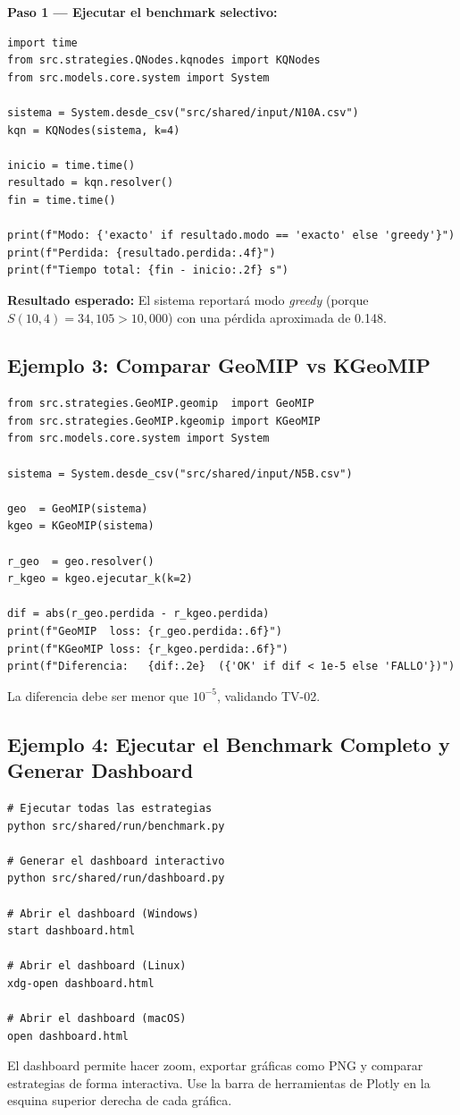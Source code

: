\textbf{Paso 1 — Ejecutar el benchmark selectivo:}

\begin{lstlisting}[style=python, caption={Benchmark selectivo para N10A.}]
import time
from src.strategies.QNodes.kqnodes import KQNodes
from src.models.core.system import System

sistema = System.desde_csv("src/shared/input/N10A.csv")
kqn = KQNodes(sistema, k=4)

inicio = time.time()
resultado = kqn.resolver()
fin = time.time()

print(f"Modo: {'exacto' if resultado.modo == 'exacto' else 'greedy'}")
print(f"Perdida: {resultado.perdida:.4f}")
print(f"Tiempo total: {fin - inicio:.2f} s")
\end{lstlisting}

\textbf{Resultado esperado:} El sistema reportará modo \textit{greedy} (porque $S(10,4) = 34{,}105 > 10{,}000$) con una pérdida aproximada de 0.148.

\subsection{Ejemplo 3: Comparar GeoMIP vs KGeoMIP}

\begin{lstlisting}[style=python, caption={Comparación directa entre GeoMIP y KGeoMIP(k=2).}]
from src.strategies.GeoMIP.geomip  import GeoMIP
from src.strategies.GeoMIP.kgeomip import KGeoMIP
from src.models.core.system import System

sistema = System.desde_csv("src/shared/input/N5B.csv")

geo  = GeoMIP(sistema)
kgeo = KGeoMIP(sistema)

r_geo  = geo.resolver()
r_kgeo = kgeo.ejecutar_k(k=2)

dif = abs(r_geo.perdida - r_kgeo.perdida)
print(f"GeoMIP  loss: {r_geo.perdida:.6f}")
print(f"KGeoMIP loss: {r_kgeo.perdida:.6f}")
print(f"Diferencia:   {dif:.2e}  ({'OK' if dif < 1e-5 else 'FALLO'})")
\end{lstlisting}

La diferencia debe ser menor que $10^{-5}$, validando TV-02.

\subsection{Ejemplo 4: Ejecutar el Benchmark Completo y Generar Dashboard}

\begin{lstlisting}[style=shell, caption={Flujo completo: benchmark + dashboard.}]
# Ejecutar todas las estrategias
python src/shared/run/benchmark.py

# Generar el dashboard interactivo
python src/shared/run/dashboard.py

# Abrir el dashboard (Windows)
start dashboard.html

# Abrir el dashboard (Linux)
xdg-open dashboard.html

# Abrir el dashboard (macOS)
open dashboard.html
\end{lstlisting}

\begin{tip}
El dashboard permite hacer zoom, exportar gráficas como PNG y comparar estrategias de forma interactiva. Use la barra de herramientas de Plotly en la esquina superior derecha de cada gráfica.
\end{tip}
